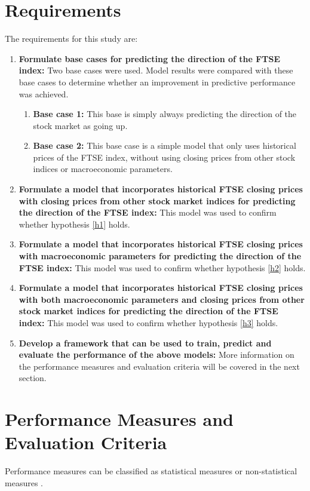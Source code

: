 \documentclass{UoYCSproject}
\begin{document}
\section{Requirements}
\label{sec:requirements}
The requirements for this study are:

\begin{enumerate}
    \item \label{basecase} \textbf{Formulate base cases for predicting the direction of the FTSE index:} Two base cases were used. Model results were compared with these base cases to determine whether an improvement in predictive performance was achieved.  
    \begin{enumerate}
        \item \label{basecase1} \textbf{Base case 1:} This base is simply always predicting the direction of the stock market as going up. 
        \item \label{basecase2} \textbf{Base case 2:} This base case is a simple model that only uses historical prices of the FTSE index, without using closing prices from other stock indices or macroeconomic parameters. 
    \end{enumerate}
    
    \item \textbf{Formulate a model that incorporates historical FTSE closing prices with closing prices from other stock market indices for predicting the direction of the FTSE index:} This model was used to confirm whether hypothesis \ref{h1} holds.
    \item \textbf{Formulate a model that incorporates historical FTSE closing prices with macroeconomic parameters for predicting the direction of the FTSE index:} This model was used to confirm whether hypothesis \ref{h2} holds.
    \item \textbf{Formulate a model that incorporates historical FTSE closing prices with both macroeconomic parameters and closing prices from other stock market indices for predicting the direction of the FTSE index:} This model was used to confirm whether hypothesis \ref{h3} holds.
    \item \label{framework} \textbf{Develop a framework that can be used to train, predict and evaluate the performance of the above models:} More information on the performance measures and evaluation criteria will be covered in the next section. 
\end{enumerate}

\section{Performance Measures and Evaluation Criteria}
Performance measures can be classified as statistical measures or non-statistical measures \cite{atsalakis2009surveying}.
\end{document}

